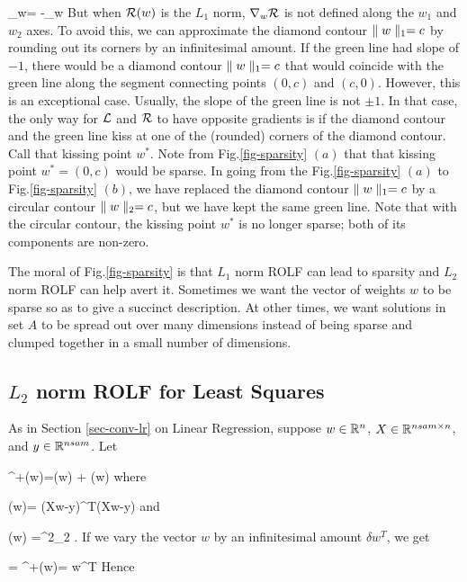 \beq
\nabla_w\call = -\nabla_w \calr
\eeq
But when ${\cal R}(w)$ is
the $L_1$ norm,  $\nabla_w{\cal R}$ is not defined along the $w_1$
and $w_2$ axes. To avoid this, we can 
approximate the diamond contour $\parallel w\parallel_1=c$
by rounding out its corners
by an infinitesimal amount. If the green line had 
slope of $-1$,
there would be a diamond contour
 $\parallel w\parallel_1=c$ that would coincide with the green line along the 
 segment connecting points $(0,c)$
 and $(c,0)$. However, this is an exceptional case. Usually, the slope
 of the green line is not $\pm 1$.
 In that case, the only way for 
 ${\cal L}$ and ${\cal R}$ to have
 opposite gradients is if the diamond 
 contour and the green line 
 kiss at one of the (rounded)  corners
 of the diamond contour. Call that
 kissing point $w^*$. Note from
 Fig.\ref{fig-sparsity} $(a)$ that that kissing point $w^*=(0,c)$ would be
 sparse. In going from the Fig.\ref{fig-sparsity} $(a)$ to Fig.\ref{fig-sparsity} $(b)$,
 we have replaced the diamond contour
 $\parallel w\parallel_1=c$ by
 a circular contour $\parallel w\parallel_2=c$,
 but we have kept the same green line.
 Note that with the circular contour,
 the kissing point $w^*$ is no longer sparse; both of its components are non-zero.
 
 The moral of Fig.\ref{fig-sparsity}
 is that $L_1$ norm ROLF can lead to sparsity and $L_2$ norm ROLF can help avert it.
 Sometimes we want the vector of weights $w$ to be sparse so as to give
 a succinct description.
 At other times, we want solutions in set $A$ to be spread out over many dimensions instead of being sparse and clumped together in a small number of dimensions.






\subsection{$L_2$ norm ROLF for Least Squares}
As in Section \ref{sec-conv-lr} on Linear Regression, 
suppose $w\in{ \mathbb{R}}^n$, $X\in { \mathbb{R}}^{nsam\times n}$,
 and  $y\in{ \mathbb{R}}^{nsam} $. Let

\beq
\call^+(w)=\call(w) + \calr(w)
\eeq
where

\beq
\call(w)=
(Xw-y)^T(Xw-y)
\eeq
and

\beq
\calr(w) =\lam{}^2_2
\;.
\eeq
If we vary the  vector $w$ by an
infinitesimal amount $\delta w^T$, we get

= \delta\call^+(w)=
\delta w^T
\eeq
Hence

